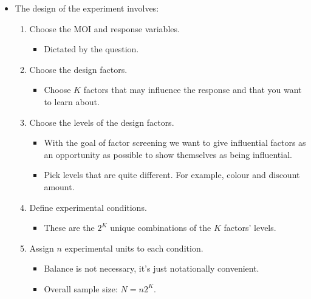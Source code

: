 \begin{itemize}[$\rightarrow$]
    \item The design of the experiment involves:
          \begin{enumerate}[1.]
              \item Choose the MOI and response variables.
                    \begin{itemize}[$\hookrightarrow$]
                        \item Dictated by the question.
                    \end{itemize}
              \item Choose the design factors.
                    \begin{itemize}[$\hookrightarrow$]
                        \item Choose $ K $ factors that may influence the response and that you want to learn about.
                    \end{itemize}
              \item Choose the levels of the design factors.
                    \begin{itemize}[$\hookrightarrow$]
                        \item With the goal of factor screening we want to give influential factors as
                              an opportunity as possible to show themselves as being influential.
                        \item Pick levels that are quite different. For example, colour and discount amount.
                    \end{itemize}
              \item Define experimental conditions.
                    \begin{itemize}[$\hookrightarrow$]
                        \item These are the $ 2^K $ unique combinations of the $ K $ factors' levels.
                    \end{itemize}
              \item Assign $ n $ experimental units to each condition.
                    \begin{itemize}[$\hookrightarrow$]
                        \item Balance is not necessary, it's just notationally convenient.
                        \item Overall sample size: $ N=n2^K $.
                    \end{itemize}
          \end{enumerate}
\end{itemize}
